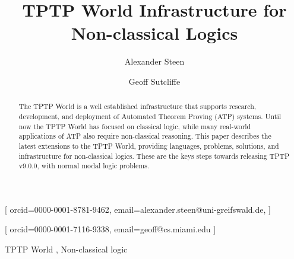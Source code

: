 \documentclass{ceurart}
\begin{document}
\title{TPTP World Infrastructure for Non-classical Logics}

\author[1]{Alexander Steen}[%
orcid=0000-0001-8781-9462,
email=alexander.steen@uni-greifswald.de,
]
\address[1]{University of Greifswald, Germany}
\author[2]{Geoff Sutcliffe}[%
orcid=0000-0001-7116-9338,
email=geoff@cs.miami.edu
]
\address[3]{University of Miami, USA}
\begin{abstract}
The TPTP World is a well established infrastructure that supports research, development, and 
deployment of Automated Theorem Proving (ATP) systems.
Until now the TPTP World has focused on classical logic, while many real-world applications of 
ATP also require non-classical reasoning. 
This paper describes the latest extensions to the TPTP World, providing languages, problems,
solutions, and infrastructure for non-classical logics.
These are the keys steps towards releasing TPTP v9.0.0, with normal modal logic problems.
\end{abstract}
\begin{keywords}
  TPTP World \sep
  Non-classical logic
\end{keywords}

% 

\maketitle
% 
\end{document}
